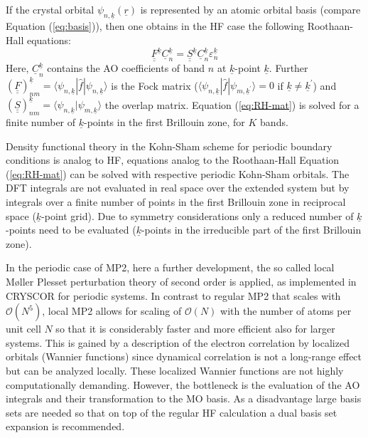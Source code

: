 \documentclass[11pt,DIV=13,BCOR=5mm,a4paper,headinclude]{scrbook}
\renewcommand{\vec}[1]{\underline{#1}}
\def\doubleunderline#1{\underline{\underline{#1}}}
\begin{document}
If the crystal orbital $\psi_{n,\vec{k}}(\vec{r})$ is represented by an atomic orbital basis (compare Equation (\ref{eq:basis})), then one obtains in the HF case the following Roothaan-Hall equations:
\begin{equation}\label{eq:RH-mat}
  \doubleunderline{F}^{\vec{k}}\vec{C}_n^{\vec{k}}=\doubleunderline{S}^{\vec{k}}\vec{C}_n^{\vec{k}}\varepsilon_n^{\vec{k}}
\end{equation}
Here, $\vec{C}_n^{\vec{k}}$ contains the AO coefficients of band $n$ at $\vec{k}$-point $\vec{k}$.
Further $(\doubleunderline{F})^{\vec{k}}_{nm}=\langle \psi_{n,\vec{k}}|\hat{f}|\psi_{n,\vec{k}}\rangle$ is the Fock matrix ($\langle \psi_{n,\vec{k}}|\hat{f}|\psi_{m,\vec{k}^\prime}\rangle=0$ if $\vec{k}\neq \vec{k}^\prime$) and $(\doubleunderline{S})^{\vec{k}}_{nm}=\langle \psi_{n,\vec{k}}|\psi_{m,\vec{k}}\rangle$ the overlap matrix.
Equation (\ref{eq:RH-mat}) is solved for a finite number of $\vec{k}$-points in the first Brillouin zone, for $K$ bands.

Density functional theory in the Kohn-Sham scheme for periodic boundary conditions is analog to HF, equations analog to the Roothaan-Hall Equation (\ref{eq:RH-mat}) can be solved with respective periodic Kohn-Sham orbitals. %
The DFT integrals are not evaluated in real space over the extended system but by integrals over a finite number of points in the first Brillouin zone in reciprocal space ($\vec{k}$-point grid).
Due to symmetry considerations only a reduced number of $\vec{k}$-points need to be evaluated ($\vec{k}$-points in the irreducible part of the first Brillouin zone).


In the periodic case of MP2, here a further development, the so called local M\o{}ller Plesset perturbation theory of second order\cite{usvyat2015,usvyatbook,Maschio2007} is applied, as implemented in CRYSCOR\cite{cryscor} for periodic systems.
In contrast to regular MP2 that scales with $\mathcal{O}(N^5)$, local MP2 allows for scaling of $\mathcal{O}(N)$ with the number of atoms per unit cell $N$ so that it is considerably faster and more efficient also for larger systems.
This is gained by a description of the electron correlation by localized orbitals (Wannier functions) since dynamical correlation is not a long-range effect but can be analyzed locally.
These localized Wannier functions are not highly computationally demanding.
However, the bottleneck is the evaluation of the AO integrals and their transformation to the MO basis.
As a disadvantage large basis sets are needed so that on top of the regular HF calculation a dual basis set expansion is recommended\cite{Usvyat2010}.
\end{document}
